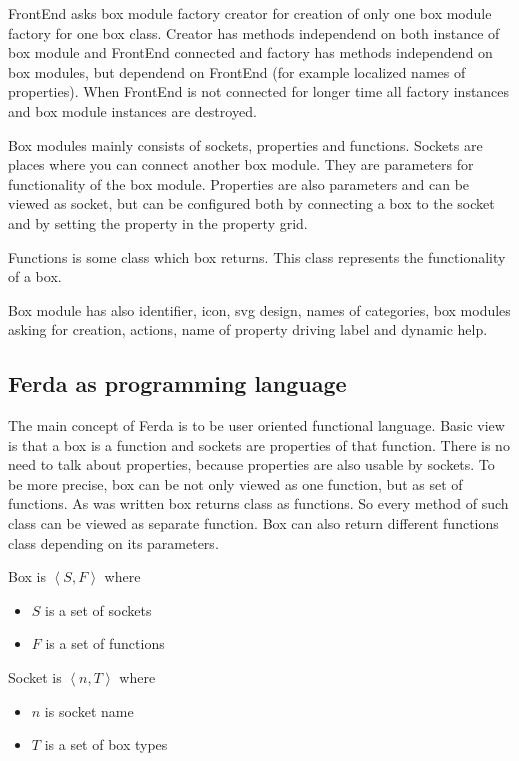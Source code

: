 \documentclass[a4paper,12pt]{book}
\begin{document}
FrontEnd asks box module factory creator for creation of only one box module factory for one box class. Creator has methods independend on both instance of box module and FrontEnd connected and factory has methods independend on box modules, but dependend on FrontEnd (for example localized names of properties). When FrontEnd is not connected for longer time all factory instances and box module instances are destroyed.

Box modules mainly consists of sockets, properties and functions. Sockets are places where you can connect another box module. They are parameters for functionality of the box module. Properties are also parameters and can be viewed as socket, but can be configured both by connecting a box to the socket and by setting the property in the property grid.

Functions is some class which box returns. This class represents the functionality of a box.

Box module has also identifier, icon, svg design, names of categories, box modules asking for creation, actions, name of property driving label and dynamic help.

\subsection{Ferda as programming language}
The main concept of Ferda is to be user oriented functional language. Basic view is that a box is a function and sockets are properties of that function. There is no need to talk about properties, because properties are also usable by sockets. To be more precise, box can be not only viewed as one function, but as set of functions. As was written box returns class as functions. So every method of such class can be viewed as separate function. Box can also return different functions class depending on its parameters. 

Box is $\left<S,F\right>$ where
\begin{itemize}
	\item $S$ is a set of sockets
	\item $F$ is a set of functions
\end{itemize}
	
Socket is $\left<n,T\right>$ where
\begin{itemize}
	\item $n$ is socket name
	\item $T$ is a set of box types
\end{itemize}
\end{document}
